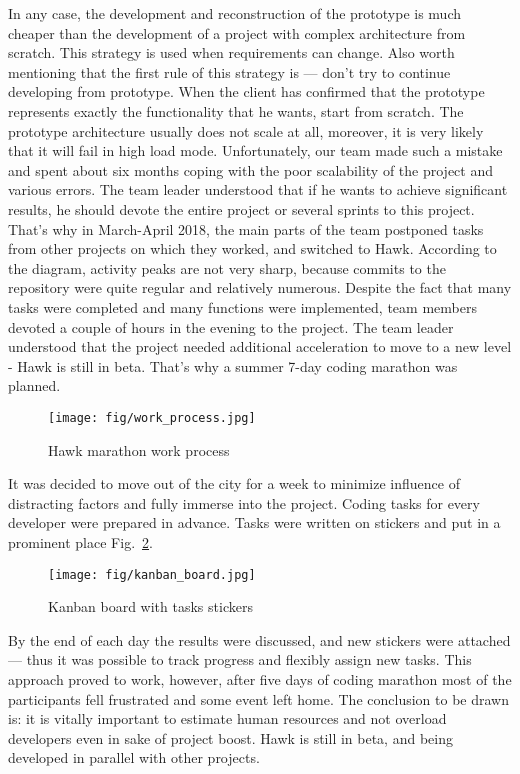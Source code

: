 \documentclass[conference]{IEEEtran}
\begin{document}
    In any case, the development and reconstruction of the prototype is much cheaper than the development of a project with complex architecture from scratch.
    This strategy is used when requirements can change.
    Also worth mentioning that the first rule of this strategy is — don't try to continue developing from prototype.
    When the client has confirmed that the prototype represents exactly the functionality that he wants, start from scratch.
    The prototype architecture usually does not scale at all, moreover, it is very likely that it will fail in high load mode.\newline
    Unfortunately, our team made such a mistake and spent about six months coping with the poor scalability of the project and various errors.
    The team leader understood that if he wants to achieve significant results, he should devote the entire project or several sprints to this project.
    That's why in March-April 2018, the main parts of the team postponed tasks from other projects on which they worked, and switched to Hawk.
    According to the diagram, activity peaks are not very sharp, because commits to the repository were quite regular and relatively numerous.\newline
    Despite the fact that many tasks were completed and many functions were implemented, team members devoted a couple of hours in the evening to the project.
    The team leader understood that the project needed additional acceleration to move to a new level - Hawk is still in beta.
    That's why a summer 7-day coding marathon was planned.
    \begin{figure}[h!]
        \centering
        \texttt{[image: fig/work\_process.jpg]}
        \caption{Hawk marathon work process}
        \label{fig:marathon}
    \end{figure}
    \newline
    It was decided to move out of the city for a week to minimize influence of distracting factors and fully immerse into the project.
    Coding tasks for every developer were prepared in advance.
    Tasks were written on stickers and put in a prominent place Fig.~\ref{fig:board}.
    \begin{figure}[h!]
        \centering
        \texttt{[image: fig/kanban\_board.jpg]}
        \caption{Kanban board with tasks stickers}
        \label{fig:board}
    \end{figure}
    \newline
    By the end of each day the results were discussed, and new stickers were attached — thus it was possible to track progress and flexibly assign new tasks.
    This approach proved to work, however, after five days of coding marathon most of the participants fell frustrated and some event left home.
    The conclusion to be drawn is: it is vitally important to estimate human resources and not overload developers even in sake of project boost.
    Hawk is still in beta, and being developed in parallel with other projects.
\end{document}
